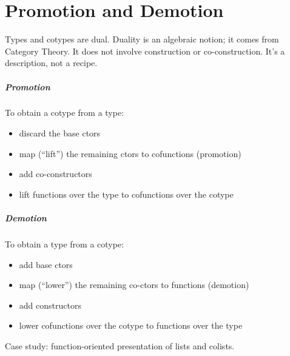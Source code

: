 \chapter{Promotion and Demotion}

Types and cotypes are dual. Duality is an algebraic notion; it comes
from Category Theory. It does not involve construction or
co-construction. It's a description, not a recipe.

\paragraph{Promotion}
To obtain a cotype from a type:

\begin{itemize}
\item discard the base ctors
\item map (``lift'') the remaining ctors to cofunctions (promotion)
\item add co-constructors
\item lift functions over the type to cofunctions over the cotype
\end{itemize}

\paragraph{Demotion}
To obtain a type from a cotype:
\begin{itemize}
\item add base ctors
\item map (``lower'') the remaining co-ctors to functions (demotion)
\item add constructors
\item lower cofunctions over the cotype to functions over the type
\end{itemize}

Case study: function-oriented presentation of lists and colists.
